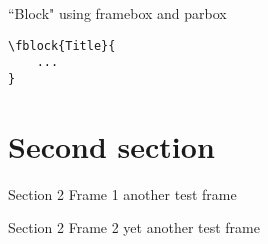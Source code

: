 \begin{frame}[fragile]{``Block" using framebox and parbox}
    \begin{verbatim}
\fblock{Title}{
    ...
}
    \end{verbatim}
	
\end{frame}


\section{Second section}


\begin{frame}{Section 2 Frame 1}
    another test frame
\end{frame}


\begin{frame}{Section 2 Frame 2}
    yet another test frame
\end{frame}
